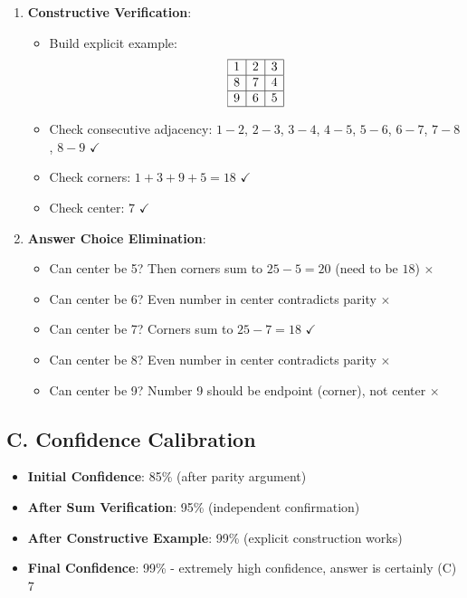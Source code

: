 \documentclass[11pt]{article}
\begin{document}
\begin{verificationbox}
\begin{enumerate}[leftmargin=*]
    \item \textbf{Constructive Verification}:
    \begin{itemize}
        \item Build explicit example:
        \[
        \begin{array}{|c|c|c|}
        \hline
        1 & 2 & 3 \\
        \hline
        8 & 7 & 4 \\
        \hline
        9 & 6 & 5 \\
        \hline
        \end{array}
        \]
        \item Check consecutive adjacency: $1-2$, $2-3$, $3-4$, $4-5$, $5-6$, $6-7$, $7-8$, $8-9$ $\checkmark$
        \item Check corners: $1+3+9+5=18$ $\checkmark$
        \item Check center: $7$ $\checkmark$
    \end{itemize}
    
    \item \textbf{Answer Choice Elimination}:
    \begin{itemize}
        \item Can center be 5? Then corners sum to $25-5=20$ (need to be $18$) $\times$
        \item Can center be 6? Even number in center contradicts parity $\times$
        \item Can center be 7? Corners sum to $25-7=18$ $\checkmark$
        \item Can center be 8? Even number in center contradicts parity $\times$
        \item Can center be 9? Number 9 should be endpoint (corner), not center $\times$
    \end{itemize}
\end{enumerate}

\subsection*{C. Confidence Calibration}
\begin{itemize}[leftmargin=*]
    \item \textbf{Initial Confidence}: 85\% (after parity argument)
    \item \textbf{After Sum Verification}: 95\% (independent confirmation)
    \item \textbf{After Constructive Example}: 99\% (explicit construction works)
    \item \textbf{Final Confidence}: 99\% - extremely high confidence, answer is certainly (C) 7
\end{itemize}
\end{verificationbox}
\end{document}
